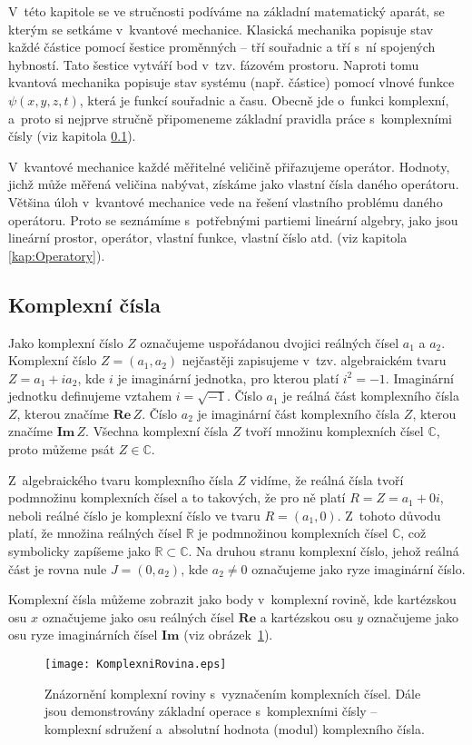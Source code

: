 V~této kapitole se ve stručnosti podíváme na základní matematický aparát, se kterým se setkáme v~kvantové mechanice. Klasická mechanika popisuje stav každé částice pomocí šestice proměnných -- tří souřadnic a tří s~ní spojených hybností. Tato šestice vytváří bod v~tzv. fázovém prostoru. Naproti tomu kvantová mechanika popisuje stav systému (např. částice) pomocí vlnové funkce $\psi(x,y,z,t)$, která je funkcí souřadnic a času. Obecně jde o~funkci komplexní, a~proto si nejprve stručně připomeneme základní pravidla práce s~komplexními čísly (viz kapitola \ref{kap:KomplexniCisla}).

V~kvantové mechanice každé měřitelné veličině přiřazujeme operátor. Hodnoty, jichž může měřená veličina nabývat, získáme jako vlastní čísla daného operátoru. Většina úloh v~kvantové mechanice vede na řešení vlastního problému daného operátoru. Proto se seznámíme s~potřebnými partiemi lineární algebry, jako jsou lineární prostor, operátor, vlastní funkce, vlastní číslo atd. (viz kapitola \ref{kap:Operatory}).

\subsection{Komplexní čísla}
\label{kap:KomplexniCisla}

Jako komplexní číslo $Z$ označujeme uspořádanou dvojici reálných čísel $a_1$ a $a_2$. Komplexní číslo $Z = (a_1, a_2)$ nejčastěji zapisujeme v~tzv. algebraickém tvaru $Z = a_1 + i a_2$, kde $i$ je imaginární jednotka, pro kterou platí $i^2 = -1$. Imaginární jednotku definujeme vztahem $i = \sqrt{-1}$. Číslo $a_1$ je reálná část komplexního čísla $Z$, kterou značíme $\mathbf{Re}\, Z$. Číslo $a_2$ je imaginární část komplexního čísla $Z$, kterou značíme $\mathbf{Im} \, Z$. Všechna komplexní čísla $Z$ tvoří množinu komplexních čísel $\mathbb{C}$, proto můžeme psát $Z \in {\mathbb{C}}$.

Z~algebraického tvaru komplexního čísla $Z$ vidíme, že reálná čísla tvoří podmnožinu komplexních čísel a to takových, že pro ně platí $R = Z = a_1 + 0i$, neboli reálné číslo je komplexní číslo ve tvaru $R = (a_1, 0)$. Z~tohoto důvodu platí, že množina reálných čísel $\mathbb{R}$ je podmnožinou komplexních čísel $\mathbb{C}$, což symbolicky zapíšeme jako $\mathbb{R}\subset \mathbb{C}$. Na druhou stranu komplexní číslo, jehož reálná část je rovna nule $J=(0,a_2)$, kde $a_2 \not = 0$ označujeme jako ryze imaginární číslo.

Komplexní čísla můžeme zobrazit jako body v~komplexní rovině, kde kartézskou osu $x$ označujeme jako osu reálných čísel $\mathbf{Re}$ a kartézskou osu $y$ označujeme jako osu ryze imaginárních čísel $\mathbf{Im}$ (viz obrázek~\ref{obr:RovinaKomplexnichCisel}).
\begin{figure} [ht]
\centering
\texttt{[image: KomplexniRovina.eps]}
\caption[Komplexní rovina]{Znázornění komplexní roviny s~vyznačením komplexních čísel. Dále jsou demonstrovány základní operace s~komplexními čísly -- komplexní sdružení a~absolutní hodnota (modul) komplexního čísla.}
\label{obr:RovinaKomplexnichCisel}
\end{figure}

